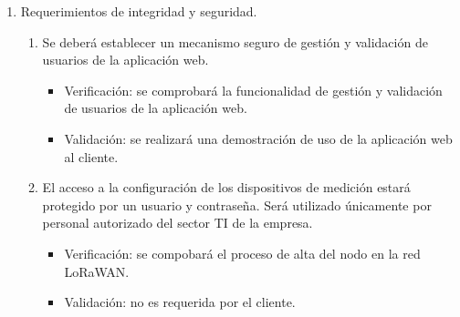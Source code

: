 \documentclass[
11pt, %
]{charter}
\begin{document}
\begin{enumerate}
	\item Requerimientos de integridad y seguridad.
		\begin{enumerate}
			\item Se deberá establecer un mecanismo seguro de gestión y validación de usuarios de la aplicación web.
			\begin{itemize}
				\item Verificación: se comprobará la funcionalidad de gestión y validación de usuarios de la aplicación web.
				\item Validación: se realizará una demostración de uso de la aplicación web al cliente.
			\end{itemize}
			\item El acceso a la configuración de los dispositivos de medición estará protegido por un usuario y contraseña. Será utilizado únicamente por personal autorizado del sector TI de la empresa.
			\begin{itemize}
				\item Verificación: se compobará el proceso de alta del nodo en la red LoRaWAN.
				\item Validación: no es requerida por el cliente.
			\end{itemize}
		\end{enumerate}
	

\end{enumerate}
\end{document}
